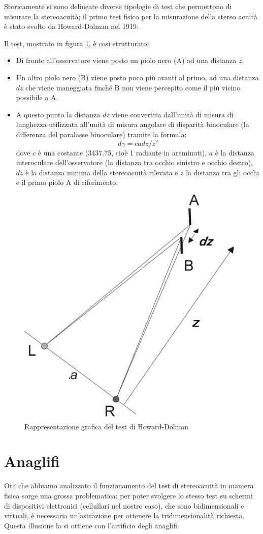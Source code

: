 \documentclass[
	corpo=12pt,
	twoside,
 	evenboxes,
	tipotesi=triennale,
    	stile=classica,
   	 greek,
]{toptesi}
\begin{document}
Storicamente si sono delineate diverse tipologie di test che permettono di misurare la stereoacuità; il primo test fisico per la misurazione della stereo acuità è stato svolto da Howard-Dolman nel 1919.

\vfill

\newpage 

Il test, mostrato in figura \ref{fig:howard_dolman}, è così strutturato:
\begin{itemize}
\item Di fronte all'osservatore viene posto un piolo nero (A) ad una distanza $z$.
\item Un altro piolo nero (B) viene posto poco più avanti al primo, ad una distanza $dz$ che viene maneggiata finché B non viene percepito come il più vicino possibile a A.
\item A questo punto la distanza $dz$ viene convertita dall'unità di misura di lunghezza utilizzata all'unità di misura angolare di disparità binoculare (la differenza del paralasse binoculare) tramite la formula: 
\begin{equation}
d\gamma = cadz/z^2
\end{equation}
dove $c$ è una costante (3437.75, cioè 1 radiante in arcminuti), $a$ è la distanza interoculare dell'osservatore (la distanza tra occhio sinistro e occhio destro), $dz$ è la distanza minima della stereoacuità rilevata e $z$ la distanza tra gli occhi e il primo piolo A di riferimento.
\end{itemize}

\begin{figure}[H]
\centering
\includegraphics[width=0.40\columnwidth]{images/howard_dolman.png}
\caption{Rappresentazione grafica del test di Howard-Dolman}
\label{fig:howard_dolman}
\end{figure}

\newpage

\section{Anaglifi}
\label{sec:anaglifi}
Ora che abbiamo analizzato il funzionamento del test di stereoacuità in maniera fisica sorge una grossa problematica: per poter svolgere lo stesso test su schermi di dispositivi elettronici (cellullari nel nostro caso), che sono bidimensionali e virtuali, è necessaria un'astrazione per ottenere la tridimensionalità richiesta. Questa illusione la si ottiene con l'artificio degli anaglifi.
\end{document}
